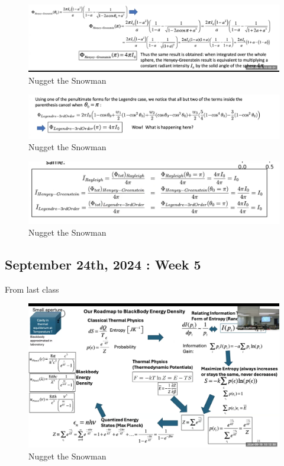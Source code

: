 \documentclass{article}
\begin{document}
\begin{figure}[h!]
\centering
\includegraphics[scale=.2]{Radiometry/Week4/Notes/PSET2/P5/Num8.png}
\caption{Nugget the Snowman}
\label{fig:Greenstein}
\end{figure}


\begin{figure}[h!]
\centering
\includegraphics[scale=.2]{Radiometry/Week4/Notes/PSET2/P5/Num9.png}
\caption{Nugget the Snowman}
\label{fig:Greenstein}
\end{figure}


\begin{figure}[h!]
\centering
\includegraphics[scale=.2]{Radiometry/Week4/Notes/PSET2/P5/Num10.png}
\caption{Nugget the Snowman}
\label{fig:Greenstein}
\end{figure}
\clearpage

\subsection{ September 24th, 2024 : Week 5}

From last class 

\begin{figure}[h!]
\centering
\includegraphics[scale=.3]{Radiometry/Week4/Notes/PSET2/BlackbodyIMP.png}
\caption{Nugget the Snowman}
\label{fig:Blackbody}
\end{figure}
\end{document}
